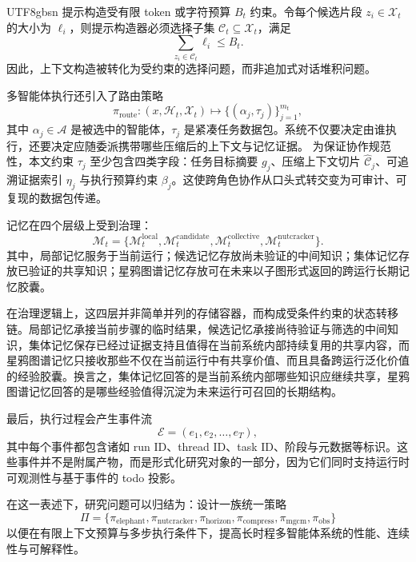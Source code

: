\documentclass[a4paper,fleqn]{cas-sc}
\begin{document}
\begin{CJK*}{UTF8}{gbsn}
提示构造受有限 token 或字符预算 $B_t$ 约束。令每个候选片段 $z_i \in \mathcal{X}_t$ 的大小为 $\ell_i$，则提示构造器必须选择子集 $\mathcal{C}_t \subseteq \mathcal{X}_t$，满足
\begin{equation}
\sum_{z_i \in \mathcal{C}_t} \ell_i \leq B_t.
\end{equation}
因此，上下文构造被转化为受约束的选择问题，而非追加式对话堆积问题。

多智能体执行还引入了路由策略
\begin{equation}
\pi_{\text{route}} : (x, \mathcal{H}_t, \mathcal{X}_t) \mapsto \{(\alpha_j, \tau_j)\}_{j=1}^{m_t},
\end{equation}
其中 $\alpha_j \in \mathcal{A}$ 是被选中的智能体，$\tau_j$ 是紧凑任务数据包。系统不仅要决定由谁执行，还要决定应随委派携带哪些压缩后的上下文与记忆证据。
为保证协作规范性，本文约束 $\tau_j$ 至少包含四类字段：任务目标摘要 $g_j$、压缩上下文切片 $\hat{\mathcal{C}}_j$、可追溯证据索引 $\eta_j$ 与执行预算约束 $\beta_j$。这使跨角色协作从口头式转交变为可审计、可复现的数据包传递。

记忆在四个层级上受到治理：
\begin{equation}
\mathcal{M}_t = \{\mathcal{M}^{\text{local}}_t, \mathcal{M}^{\text{candidate}}_t, \mathcal{M}^{\text{collective}}_t, \mathcal{M}^{\text{nutcracker}}_t\}.
\end{equation}
其中，局部记忆服务于当前运行；候选记忆存放尚未验证的中间知识；集体记忆存放已验证的共享知识；星鸦图谱记忆存放可在未来以子图形式返回的跨运行长期记忆胶囊。

在治理逻辑上，这四层并非简单并列的存储容器，而构成受条件约束的状态转移链。局部记忆承接当前步骤的临时结果，候选记忆承接尚待验证与筛选的中间知识，集体记忆保存已经过证据支持且值得在当前系统内部持续复用的共享内容，而星鸦图谱记忆只接收那些不仅在当前运行中有共享价值、而且具备跨运行泛化价值的经验胶囊。换言之，集体记忆回答的是当前系统内部哪些知识应继续共享，星鸦图谱记忆回答的是哪些经验值得沉淀为未来运行可召回的长期结构。

最后，执行过程会产生事件流
\begin{equation}
\mathcal{E} = (e_1, e_2, \ldots, e_T),
\end{equation}
其中每个事件都包含诸如 run ID、thread ID、task ID、阶段与元数据等标识。这些事件并不是附属产物，而是形式化研究对象的一部分，因为它们同时支持运行时可观测性与基于事件的 todo 投影。

在这一表述下，研究问题可以归结为：设计一族统一策略
\begin{equation}
\Pi = \{\pi_{\text{elephant}}, \pi_{\text{nutcracker}}, \pi_{\text{horizon}}, \pi_{\text{compress}}, \pi_{\text{mgcm}}, \pi_{\text{obs}}\}
\end{equation}
以便在有限上下文预算与多步执行条件下，提高长时程多智能体系统的性能、连续性与可解释性。


\end{CJK*}
\end{document}
